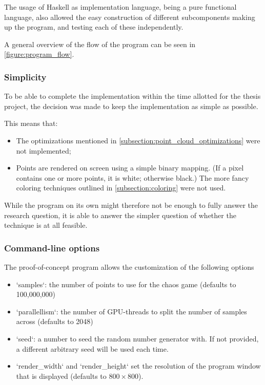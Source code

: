 \documentclass[11pt]{article}
\begin{document}
The usage of Haskell as implementation language, being a pure functional language, also allowed 
the easy construction of different subcomponents making up the program,
and testing each of these independently.

A general overview of the flow of the program can be seen in \autoref{figure:program_flow}.

\subsubsection{Simplicity}
\label{sec:org96125f5}

To be able to complete the implementation within the time allotted for the thesis project,
the decision was made to keep the implementation as simple as possible.

This means that:

\begin{itemize}
\item The optimizations mentioned in \autoref{subsection:point_cloud_optimizations} were not implemented;
\item Points are rendered on screen using a simple binary mapping. (If a pixel contains one or more points, it is white; otherwise black.)
The more fancy coloring techniques outlined in \autoref{subsection:coloring} were not used.
\end{itemize}

While the program on its own might therefore not be enough to fully answer the research question,
it is able to answer the simpler question of whether the technique is at all feasible.

\subsubsection{Command-line options}
\label{sec:orgda288ec}

The proof-of-concept program allows the customization of the following options

\begin{itemize}
\item `samples`: the number of points to use for the chaos game (defaults to 100,000,000)
\item `parallellism`: the number of GPU-threads to split the number of samples across (defaults to 2048)
\item `seed`: a number to seed the random number generator with. If not provided, a different arbitrary seed will be used each time.
\item `render\_width` and `render\_height` set the resolution of the program window that is displayed (defaults to \(800 \times 800\)).
\end{itemize}
\end{document}
